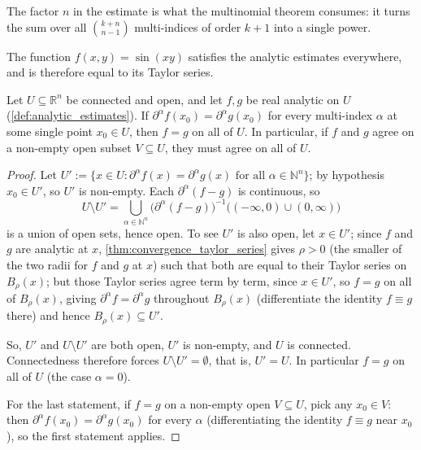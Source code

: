 The factor $n$ in the estimate is what the multinomial theorem consumes: it turns the sum over all
$\binom{k+n}{n-1}$ multi-indices of order $k+1$ into a single power.

\begin{example}
\label{ex:analytic_function_sin_xy}
The function $f(x,y) = \sin(xy)$ satisfies the analytic estimates everywhere, and is therefore equal to its Taylor series.
\end{example}

\begin{corollary}
\label{cor:unique_continuation}
Let $U \subseteq \mathbb{R}^n$ be connected and open, and let $f,g$ be real analytic on $U$
(\cref{def:analytic_estimates}). If $\partial^\alpha f(x_0) = \partial^\alpha g(x_0)$ for every
multi-index $\alpha$ at some single point $x_0 \in U$, then $f = g$ on all of $U$. In
particular, if $f$ and $g$ agree on a non-empty open subset $V \subseteq U$, they must agree on
all of $U$.
\end{corollary}

\begin{proof}
Let $U' := \{x \in U : \partial^\alpha f(x) = \partial^\alpha g(x) \text{ for all } \alpha \in
\mathbb{N}^n\}$; by hypothesis $x_0 \in U'$, so $U'$ is non-empty. Each $\partial^\alpha(f-g)$ is
continuous, so
\[U \setminus U' = \bigcup_{\alpha \in \mathbb{N}^n} \big(\partial^\alpha(f-g)\big)^{-1}\big((-\infty,0)\cup(0,\infty)\big)\]
is a union of open sets, hence open. To see $U'$ is also open, let $x \in U'$; since $f$ and $g$
are analytic at $x$, \cref{thm:convergence_taylor_series} gives $\rho>0$ (the smaller of the two
radii for $f$ and $g$ at $x$) such that both are equal to their Taylor series on $B_\rho(x)$; but
those Taylor series agree term by term, since $x \in U'$, so $f=g$ on all of $B_\rho(x)$, giving
$\partial^\alpha f = \partial^\alpha g$ throughout $B_\rho(x)$ (differentiate the identity
$f\equiv g$ there) and hence $B_\rho(x) \subseteq U'$.

So, $U'$ and $U\setminus U'$ are both open, $U'$ is non-empty, and $U$ is connected. Connectedness
therefore forces $U \setminus U' = \emptyset$, that is, $U' = U$. In particular $f = g$ on all of
$U$ (the case
$\alpha = 0$).

For the last statement, if $f=g$ on a non-empty open $V \subseteq U$, pick any $x_0 \in V$: then
$\partial^\alpha f(x_0) = \partial^\alpha g(x_0)$ for every $\alpha$ (differentiating the
identity $f \equiv g$ near $x_0$), so the first statement applies.
\end{proof}

